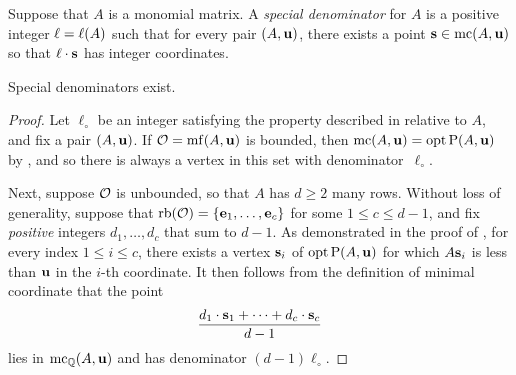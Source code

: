 \documentclass[11pt]{amsart}
\begin{document}


\begin{definition}  Suppose that $A$ is a monomial matrix. A \emph{special denominator} for $A$ is a positive integer $\ell = \ell(A)$ such that for every pair $(A, \mathbf{u})$, there exists a point $\mathbf{s} \in \operatorname{mc}(A, \mathbf{u})$ so that $\ell \cdot \mathbf{s}$ has integer coordinates.
\end{definition}

\begin{theorem}  
\label{special-denominators-exist:  T}
Special denominators exist.
\end{theorem}


\begin{proof}
   Let $\ell_{\circ}$ be an integer satisfying the property described in  relative to $A$, and fix a pair $(A, \mathbf{u})$.
   If $\mathcal{O} = \operatorname{mf}(A, \mathbf{u})$ is bounded, then $\operatorname{mc}(A, \mathbf{u}) = \operatorname{opt} \mathrm{P}(A, \mathbf{u})$ by , and so there is always a vertex in this set with denominator~$\ell_{\circ}$.

   Next, suppose $\mathcal{O}$ is unbounded, so that $A$ has $d \geq 2$ many rows.
   Without loss of generality, suppose that $\operatorname{rb}(\mathcal{O}) = \{ \mathbf{e}_1, \ldots, \mathbf{e}_c \}$ for some $1 \leq c \leq d-1$, and fix \emph{positive} integers $d_1, \ldots, d_c$ that sum to $d-1$.
   As demonstrated in the  proof of , for every index  $1 \leq i \leq c$, there exists a vertex $\mathbf{s}_i$ of $\operatorname{opt} \mathrm{P}(A, \mathbf{u})$ for which $A \mathbf{s}_i$ is less than $\mathbf{u}$ in the $i$-th coordinate.
   It then follows from the definition of minimal coordinate that the point
   \[ \frac{ d_1 \cdot \mathbf{s}_1 + \cdots + d_c \cdot  \mathbf{s}_c}{d-1}  \]
   lies in $\operatorname{mc}_{\mathbb{Q}}(A, \mathbf{u})$ and has denominator $(d-1)\ell_{\circ}$.  
\end{proof}
\end{document}
